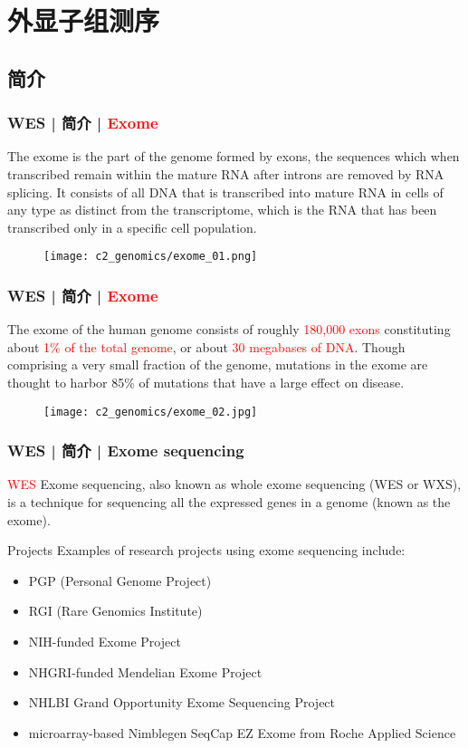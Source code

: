 \section{外显子组测序}
\subsection{简介}
\begin{frame}
  \frametitle{WES | 简介 | \textcolor{red}{Exome}}
  The exome is the part of the genome formed by exons, the sequences which when transcribed remain within the mature RNA after introns are removed by RNA splicing. It consists of all DNA that is transcribed into mature RNA in cells of any type as distinct from the transcriptome, which is the RNA that has been transcribed only in a specific cell population.
  \begin{figure}
    \centering
    \texttt{[image: c2\_genomics/exome\_01.png]}
  \end{figure}
\end{frame}

\begin{frame}
  \frametitle{WES | 简介 | \textcolor{red}{Exome}}
  The exome of the human genome consists of roughly \textcolor{red}{180,000 exons} constituting about \textcolor{red}{1\% of the total genome}, or about \textcolor{red}{30 megabases of DNA}. Though comprising a very small fraction of the genome, mutations in the exome are thought to harbor 85\% of mutations that have a large effect on disease.
  \begin{figure}
    \centering
    \texttt{[image: c2\_genomics/exome\_02.jpg]}
  \end{figure}
\end{frame}

\begin{frame}
  \frametitle{WES | 简介 | Exome sequencing}
  \begin{block}{\textcolor{red}{WES}}
  Exome sequencing, also known as whole exome sequencing (WES or WXS), is a technique for sequencing all the expressed genes in a genome (known as the exome).
  \end{block}
  \pause
  \begin{block}{Projects}
    Examples of research projects using exome sequencing include:
    \begin{itemize}
      \item PGP (Personal Genome Project)
      \item RGI (Rare Genomics Institute)
      \item NIH-funded Exome Project
      \item NHGRI-funded Mendelian Exome Project
      \item NHLBI Grand Opportunity Exome Sequencing Project
      \item microarray-based Nimblegen SeqCap EZ Exome from Roche Applied Science
    \end{itemize}
  \end{block}
\end{frame}

